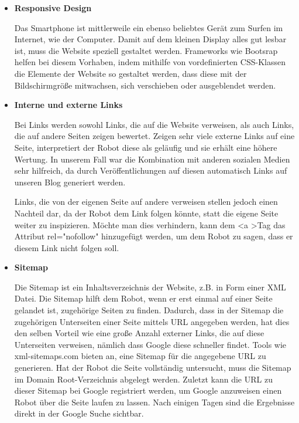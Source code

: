 {\begin{itemize}
        Im \textless body \textgreater, also im eigentlichen Inhalt der Website legt der Robot zum einen sehr viel Wert auf Struktur. Beispielsweise muss die Verschachtelung der Tags stimmen,
        oder der \textless h1 \textgreater Tag darf nur einmal pro Seite vorkommen.
        Zum anderen werden Inhalt und Code in Relation gesetzt. Wenn der Aufbau des HTML Dokuments sehr groß ist, in jedem Absatz jedoch nur ein Satz steht, kennt sich der Robot nicht aus.

      \item \textbf{Responsive Design}

        Das Smartphone ist mittlerweile ein ebenso beliebtes Gerät zum Surfen im Internet, wie der Computer. Damit auf dem kleinen Display alles gut lesbar ist, muss die Website speziell
        gestaltet werden. Frameworks wie Bootsrap helfen bei diesem Vorhaben, indem mithilfe von vordefinierten CSS-Klassen die Elemente der Website so gestaltet werden, dass diese mit der
        Bildschirmgröße mitwachsen, sich verschieben oder ausgeblendet werden.

      \item \textbf{Interne und externe Links}

        Bei Links werden sowohl Links, die auf die Website verweisen, als auch Links, die auf andere Seiten zeigen bewertet.
        Zeigen sehr viele externe Links auf eine Seite, interpretiert der Robot diese als geläufig und sie erhält eine höhere Wertung. In unserem Fall war die Kombination mit anderen sozialen
        Medien sehr hilfreich, da durch Veröffentlichungen auf diesen automatisch Links auf unseren Blog generiert werden.

        Links, die von der eigenen Seite auf andere verweisen stellen jedoch einen Nachteil dar, da der Robot dem Link folgen könnte, statt die eigene Seite weiter zu inspizieren. Möchte man dies
        verhindern, kann dem \textless a \textgreater Tag das Attribut rel="nofollow" hinzugefügt werden, um dem Robot zu sagen, dass er diesem Link nicht folgen soll.

      \item \textbf{Sitemap}

      	Die Sitemap ist ein Inhaltsverzeichnis der Website, z.B. in Form einer XML Datei. Die Sitemap hilft dem Robot, wenn er erst einmal auf einer Seite gelandet ist, zugehörige Seiten
        zu finden. Dadurch, dass in der Sitemap die zugehörigen Unterseiten einer Seite mittels URL angegeben werden, hat dies den selben Vorteil wie eine große Anzahl externer Links, die auf diese
        Unterseiten verweisen, nämlich dass Google diese schneller findet. Tools wie xml-sitemaps.com bieten an, eine Sitemap für die angegebene URL zu generieren. Hat der Robot die Seite vollständig
        untersucht, muss die Sitemap im Domain Root-Verzeichnis abgelegt werden. Zuletzt kann die URL zu dieser Sitemap bei Google registriert werden, um Google anzuweisen einen Robot über die Seite
        laufen zu lassen. Nach einigen Tagen sind die Ergebnisse direkt in der Google Suche sichtbar.


\end{itemize}}
